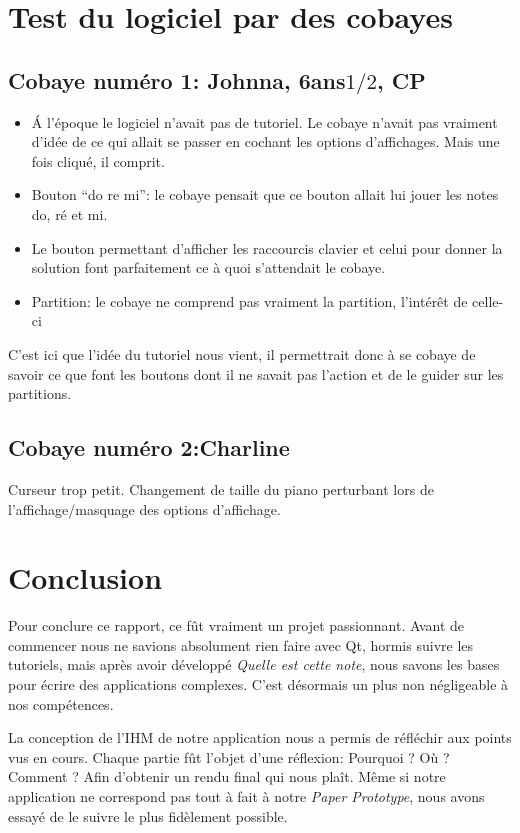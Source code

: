 \documentclass{article}
\begin{document}
\section{Test du logiciel par des cobayes}
\subsection{Cobaye numéro 1: Johnna, 6ans$1/2$, CP}

\begin{itemize}
\item \'A l'époque le logiciel n'avait pas de tutoriel. Le cobaye n'avait pas vraiment d'idée de ce qui allait se passer en cochant les 
options d'affichages. Mais une fois cliqué, il comprit.
\item Bouton ``do re mi'': le cobaye pensait que ce bouton allait lui jouer les notes do, ré et mi.
\item Le bouton permettant d'afficher les raccourcis clavier et celui pour donner la solution font parfaitement ce à quoi s'attendait
le cobaye.
\item Partition: le cobaye ne comprend pas vraiment la partition, l'intérêt de celle-ci
\end{itemize}

C'est ici que l'idée du tutoriel nous vient, il permettrait donc à se cobaye de savoir ce que font les boutons dont il ne savait pas
l'action et de le guider sur les partitions.

\subsection{Cobaye numéro 2:Charline}

Curseur trop petit.
Changement de taille du piano perturbant lors de l'affichage/masquage des options d'affichage.


\section{Conclusion}
Pour conclure ce rapport, ce fût vraiment un projet passionnant. Avant de commencer nous ne savions absolument rien faire avec Qt, hormis suivre les tutoriels, mais après avoir développé \emph{Quelle est cette note}, nous savons les bases pour écrire des applications complexes. C'est désormais un plus non négligeable à nos compétences. 

La conception de l'IHM de notre application nous a permis de réfléchir aux points vus en cours. Chaque partie fût l'objet d'une réflexion: Pourquoi ? Où ? Comment ? Afin d'obtenir un rendu final qui nous plaît. Même si notre application ne correspond pas tout à fait à notre \emph{Paper Prototype}, nous avons essayé de le suivre le plus fidèlement possible. 
\end{document}
